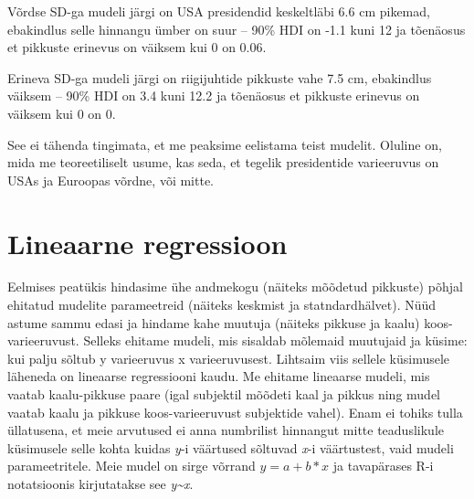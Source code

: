 \documentclass[]{book}
\newenvironment{Shaded}{\begin{snugshade}}{\end{snugshade}}
\newcommand{\KeywordTok}[1]{\textcolor[rgb]{0.13,0.29,0.53}{\textbf{#1}}}
\newcommand{\DataTypeTok}[1]{\textcolor[rgb]{0.13,0.29,0.53}{#1}}
\newcommand{\DecValTok}[1]{\textcolor[rgb]{0.00,0.00,0.81}{#1}}
\newcommand{\FloatTok}[1]{\textcolor[rgb]{0.00,0.00,0.81}{#1}}
\newcommand{\StringTok}[1]{\textcolor[rgb]{0.31,0.60,0.02}{#1}}
\newcommand{\CommentTok}[1]{\textcolor[rgb]{0.56,0.35,0.01}{\textit{#1}}}
\newcommand{\OperatorTok}[1]{\textcolor[rgb]{0.81,0.36,0.00}{\textbf{#1}}}
\newcommand{\NormalTok}[1]{#1}
\begin{document}
Võrdse SD-ga mudeli järgi on USA presidendid keskeltläbi 6.6 cm pikemad,
ebakindlus selle hinnangu ümber on suur -- 90\% HDI on -1.1 kuni 12 ja
tõenäosus et pikkuste erinevus on väiksem kui 0 on 0.06.

\begin{Shaded}
\end{Shaded}

Erineva SD-ga mudeli järgi on riigijuhtide pikkuste vahe 7.5 cm,
ebakindlus väiksem -- 90\% HDI on 3.4 kuni 12.2 ja tõenäosus et pikkuste
erinevus on väiksem kui 0 on 0.

See ei tähenda tingimata, et me peaksime eelistama teist mudelit.
Oluline on, mida me teoreetiliselt usume, kas seda, et tegelik
presidentide varieeruvus on USAs ja Euroopas võrdne, või mitte.

\section*{Lineaarne regressioon}\label{lineaarne-regressioon}

Eelmises peatükis hindasime ühe andmekogu (näiteks mõõdetud pikkuste)
põhjal ehitatud mudelite parameetreid (näiteks keskmist ja
statndardhälvet). Nüüd astume sammu edasi ja hindame kahe muutuja
(näiteks pikkuse ja kaalu) koos-varieeruvust. Selleks ehitame mudeli,
mis sisaldab mõlemaid muutujaid ja küsime: kui palju sõltub y
varieeruvus x varieeruvusest. Lihtsaim viis sellele küsimusele läheneda
on lineaarse regressiooni kaudu. Me ehitame lineaarse mudeli, mis vaatab
kaalu-pikkuse paare (igal subjektil mõõdeti kaal ja pikkus ning mudel
vaatab kaalu ja pikkuse koos-varieeruvust subjektide vahel). Enam ei
tohiks tulla üllatusena, et meie arvutused ei anna numbrilist hinnangut
mitte teaduslikule küsimusele selle kohta kuidas \emph{y}-i väärtused
sõltuvad \emph{x}-i väärtustest, vaid mudeli parameetritele. Meie mudel
on sirge võrrand \(y = a + b*x\) ja tavapärases R-i notatsioonis
kirjutatakse see \emph{y\textasciitilde{}x}.
\end{document}
